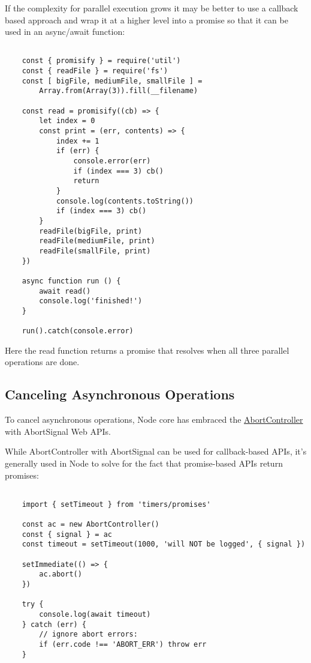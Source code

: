 \documentclass{scrartcl}
\begin{document}
If the complexity for parallel execution grows it may be better to use a callback based approach and wrap it at a higher level into a promise so that it can be used in an async/await function:

\begin{lstlisting}[style=ES6]

    const { promisify } = require('util')
    const { readFile } = require('fs')
    const [ bigFile, mediumFile, smallFile ] =
        Array.from(Array(3)).fill(__filename)

    const read = promisify((cb) => {
        let index = 0
        const print = (err, contents) => {
            index += 1
            if (err) {
                console.error(err)
                if (index === 3) cb()
                return
            }
            console.log(contents.toString())
            if (index === 3) cb()
        }
        readFile(bigFile, print)
        readFile(mediumFile, print)
        readFile(smallFile, print)
    })

    async function run () {
        await read()
        console.log('finished!')
    }

    run().catch(console.error)
\end{lstlisting}

Here the read function returns a promise that resolves when all three parallel operations are done.

\subsection{Canceling Asynchronous Operations}

To cancel asynchronous operations, Node core has embraced the  \href{https://developer.mozilla.org/en-US/docs/Web/API/AbortController}{AbortController} with AbortSignal Web APIs.

While AbortController with AbortSignal can be used for callback-based APIs, it's generally used in Node to solve for the fact that promise-based APIs return promises:


\begin{lstlisting}[style=ES6]

    import { setTimeout } from 'timers/promises'

    const ac = new AbortController()
    const { signal } = ac
    const timeout = setTimeout(1000, 'will NOT be logged', { signal })

    setImmediate(() => {
        ac.abort()
    })

    try {
        console.log(await timeout)
    } catch (err) {
        // ignore abort errors:
        if (err.code !== 'ABORT_ERR') throw err
    }

\end{lstlisting}
\end{document}
